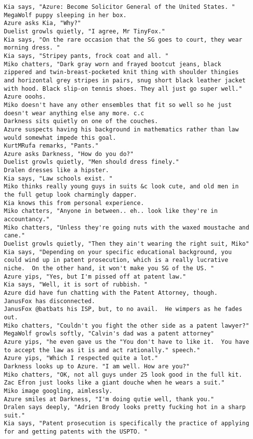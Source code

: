 \begin{verbatim}
Kia says, "Azure: Become Solicitor General of the United States. "
MegaWolf puppy sleeping in her box.
Azure asks Kia, "Why?"
Duelist growls quietly, "I agree, Mr TinyFox."
Kia says, "On the rare occasion that the SG goes to court, they wear morning dress. "
Kia says, "Stripey pants, frock coat and all. "
Miko chatters, "Dark gray worn and frayed bootcut jeans, black zippered and twin-breast-pocketed knit thing with shoulder thingies and horizontal grey stripes in pairs, snug short black leather jacket with hood. Black slip-on tennis shoes. They all just go super well."
Azure ooohs.
Miko doesn't have any other ensembles that fit so well so he just doesn't wear anything else any more. c.c
Darkness sits quietly on one of the couches.
Azure suspects having his background in mathematics rather than law would somewhat impede this goal.
KurtMRufa remarks, "Pants."
Azure asks Darkness, "How do you do?"
Duelist growls quietly, "Men should dress finely."
Dralen dresses like a hipster.
Kia says, "Law schools exist. "
Miko thinks really young guys in suits &c look cute, and old men in the full getup look charmingly dapper.
Kia knows this from personal experience.
Miko chatters, "Anyone in between.. eh.. look like they're in accountancy."
Miko chatters, "Unless they're going nuts with the waxed moustache and cane."
Duelist growls quietly, "Then they ain't wearing the right suit, Miko"
Kia says, "Depending on your specific educational background, you could wind up in patent prosecution, which is a really lucrative niche.  On the other hand, it won't make you SG of the US. "
Azure yips, "Yes, but I'm pissed off at patent law."
Kia says, "Well, it is sort of rubbish. "
Azure did have fun chatting with the Patent Attorney, though.
JanusFox has disconnected.
JanusFox @batbats his ISP, but, to no avail.  He wimpers as he fades out.
Miko chatters, "Couldn't you fight the other side as a patent lawyer?"
MegaWolf growls softly, "Calvin's dad was a patent attorney"
Azure yips, "he even gave us the "You don't have to like it.  You have to accept the law as it is and act rationally." speech."
Azure yips, "Which I respected quite a lot."
Darkness looks up to Azure. "I am well. How are you?"
Miko chatters, "OK, not all guys under 25 look good in the full kit. Zac Efron just looks like a giant douche when he wears a suit."
Miko image googling, aimlessly.
Azure smiles at Darkness, "I'm doing qutie well, thank you."
Dralen says deeply, "Adrien Brody looks pretty fucking hot in a sharp suit."
Kia says, "Patent prosecution is specifically the practice of applying for and getting patents with the USPTO. "

\end{verbatim}
